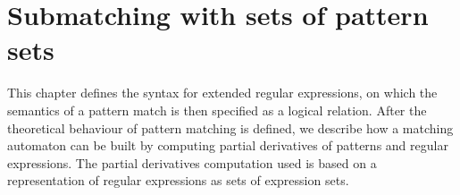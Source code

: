 \chapter{Submatching with sets of pattern sets}
\label{submatching}

This chapter defines the syntax for extended regular expressions, on which the
semantics of a pattern match is then specified as a logical relation.  After the
theoretical behaviour of pattern matching is defined, we describe how a matching
automaton can be built by computing partial derivatives of patterns and regular
expressions. The partial derivatives computation used is based on a
representation of regular expressions as sets of expression sets.









